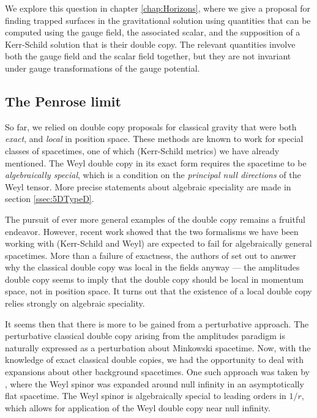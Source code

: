 We explore this question in chapter \ref{chap:Horizons}, where we give a proposal for finding trapped surfaces in
the gravitational solution using quantities that can be computed using the gauge field, the associated scalar, and
the supposition of a Kerr-Schild solution that is their double copy. The relevant quantities involve both the gauge
field and the scalar field together, but they are not invariant under gauge transformations of the gauge potential.

\subsection{\texorpdfstring{The Penrose limit
}{The Penrose limit }}

So far, we relied on double copy proposals for classical gravity that were both
\textit{exact}, and \textit{local} in position space. These methods are known to work for special classes of
spacetimes, one of which (Kerr-Schild metrics) we have already mentioned. The Weyl double copy in its exact form
requires the spacetime to be \textit{algebraically special}, which is a condition on the \textit{principal null
directions} of the Weyl tensor. More precise statements about algebraic speciality are made in section
\ref{ssec:5DTypeD}.

The pursuit of ever more general examples of the double copy remains a fruitful endeavor. However, recent work
\cite{Luna:2022dxo} showed that the two formalisms we have been working with (Kerr-Schild and Weyl) are expected to
fail for algebraically general spacetimes. More than a failure of exactness, the authors of \cite{Luna:2022dxo} set
out to answer why the classical double copy was local in the fields anyway --- the amplitudes double copy seems to
imply that the double copy should be local in momentum space, not in position space. It turns out that the
existence of a local double copy relies strongly on algebraic speciality. 

It seems then that there is more to be gained from a perturbative approach. The perturbative classical double copy
arising from the amplitudes paradigm is naturally expressed as a perturbation about Minkowski spacetime. Now, with the
knowledge of exact classical double copies, we had the opportunity to deal with expansions about other background
spacetimes. One such approach was taken by \cite{Godazgar:2021iae}, where the Weyl spinor was expanded around null
infinity in an asymptotically flat spacetime. The Weyl spinor is algebraically special to leading orders in $1 /
r$, which allows for application of the Weyl double copy near null infinity.


